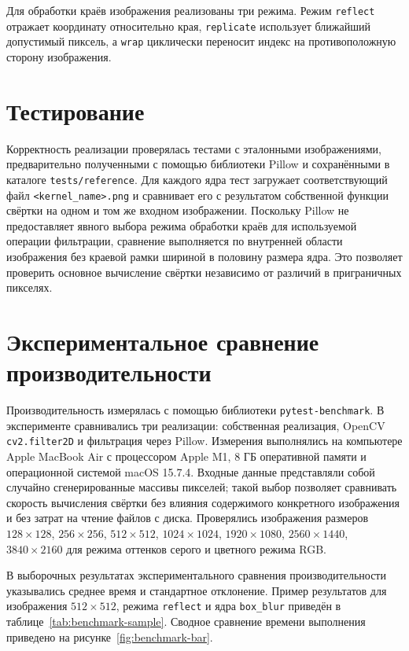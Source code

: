 \documentclass[a4paper]{article}
\begin{document}
Для обработки краёв изображения реализованы три режима. Режим \texttt{reflect} отражает координату относительно края, \texttt{replicate} использует ближайший допустимый пиксель, а \texttt{wrap} циклически переносит индекс на противоположную сторону изображения.

\section{Тестирование}

Корректность реализации проверялась тестами с эталонными изображениями, предварительно полученными с помощью библиотеки Pillow и сохранёнными в каталоге \texttt{tests/reference}. Для каждого ядра тест загружает соответствующий файл \texttt{<kernel\_name>.png} и сравнивает его с результатом собственной функции свёртки на одном и том же входном изображении. Поскольку Pillow не предоставляет явного выбора режима обработки краёв для используемой операции фильтрации, сравнение выполняется по внутренней области изображения без краевой рамки шириной в половину размера ядра. Это позволяет проверить основное вычисление свёртки независимо от различий в приграничных пикселях.

\section{Экспериментальное сравнение производительности}

Производительность измерялась с помощью библиотеки \texttt{pytest-benchmark}. В эксперименте сравнивались три реализации: собственная реализация, OpenCV \texttt{cv2.filter2D} и фильтрация через Pillow. Измерения выполнялись на компьютере Apple MacBook Air с процессором Apple M1, 8 ГБ оперативной памяти и операционной системой macOS 15.7.4. Входные данные представляли собой случайно сгенерированные массивы пикселей; такой выбор позволяет сравнивать скорость вычисления свёртки без влияния содержимого конкретного изображения и без затрат на чтение файлов с диска. Проверялись изображения размеров \(128 \times 128\), \(256 \times 256\), \(512 \times 512\), \(1024 \times 1024\), \(1920 \times 1080\), \(2560 \times 1440\), \(3840 \times 2160\) для режима оттенков серого и цветного режима RGB.

В выборочных результатах экспериментального сравнения производительности указывались среднее время и стандартное отклонение. Пример результатов для изображения \(512 \times 512\), режима \texttt{reflect} и ядра \texttt{box\_blur} приведён в таблице~\ref{tab:benchmark-sample}. Сводное сравнение времени выполнения приведено на рисунке~\ref{fig:benchmark-bar}.
\end{document}
